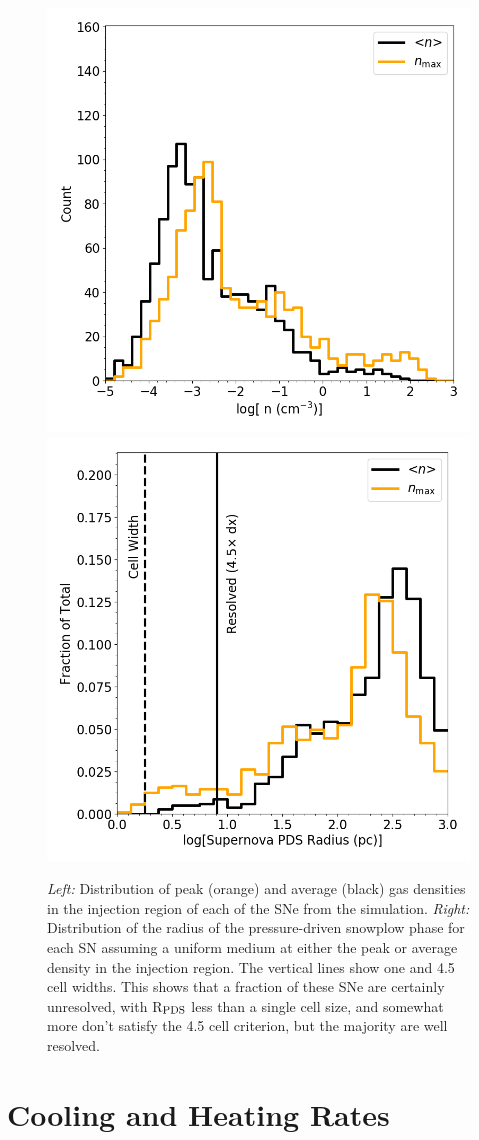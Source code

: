 \begin{figure}
\centering
\includegraphics[width=0.4\linewidth]{figures/ch1/sn_density_hist}
\includegraphics[width=0.4\linewidth]{figures/ch1/sn_radius_hist}
\caption{{\em Left:} Distribution of peak (orange) and average (black) gas densities in the injection region of each of the SNe from the simulation. {\em Right:} Distribution of the radius of the pressure-driven snowplow phase for each SN assuming a uniform medium at either the peak or average density in the injection region. The vertical lines show one and 4.5 cell widths. This shows that a fraction of these SNe are certainly unresolved, with R$_{\rm PDS}$ less than a single cell size, and somewhat more don't satisfy the 4.5 cell criterion, but the majority are well resolved.}
\label{ch1:fig:SN histogram}
\end{figure}

\section{Cooling and Heating Rates}
\label{appendix:cooling}

